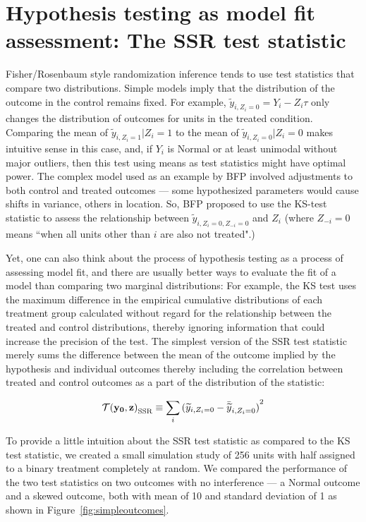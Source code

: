 \section{Hypothesis testing as model fit assessment: The SSR test statistic}

Fisher/Rosenbaum style randomization inference tends to use test statistics that
compare two distributions. Simple models imply that the distribution of the
outcome in the control remains fixed. For example, $\widetilde
y_{i,Z_i=0}=Y_i-Z_i \tau$ only changes the distribution of outcomes for units
in the treated condition. Comparing the mean of $\widetilde y_{i,Z_i=1}|Z_i=1$
to the mean of $\widetilde y_{i,Z_i=0}|Z_i=0$ makes intuitive sense in this
case, and, if $Y_i$ is Normal or at least unimodal without major outliers,
then this test using means as test statistics might have optimal power. The complex model used as an example
by BFP involved adjustments to both control and treated outcomes --- some
hypothesized parameters would cause shifts in variance, others in location.
So, BFP proposed to use the KS-test statistic to assess the relationship
between $\widetilde y_{i,Z_i=0,Z_{-i}=0}$ and $Z_i$ (where $Z_{-i}=0$ means
``when all units other than $i$ are also not treated".)

Yet, one can also think about the process of hypothesis testing as a process
of assessing model fit, and there are usually better ways to evaluate the fit
of a model than comparing two marginal distributions: For example, the KS test
  uses the maximum difference in the empirical cumulative distributions of
  each treatment group calculated without regard for the relationship between
the treated and control distributions, thereby ignoring information that could
increase the precision of the test. The simplest version of the SSR test
statistic merely sums the difference between the mean of the outcome implied
by the hypothesis and individual outcomes thereby including the correlation
between treated and control outcomes as a part of the distribution of the
statistic:

\begin{equation}
 {\mathcal{T}(\mathbf{y}_{\mathbf{0}},\mathbf{z})}_{\text{SSR}} \equiv \sum_{i} {( \widetilde y_{i,Z_i=0} - \bar{\widetilde{y}}_{i,Z_i=0} )}^2 \label{eq:ssr1}
\end{equation}

To provide a little intuition about the SSR test statistic as compared to the
KS test statistic, we created a small simulation study of 256 units with half
assigned to a binary treatment completely at random. We compared the
performance of the two test statistics on two outcomes with no interference
--- a Normal outcome and a skewed outcome, both with mean of 10 and standard
deviation of 1 as shown in Figure~\ref{fig:simpleoutcomes}.

